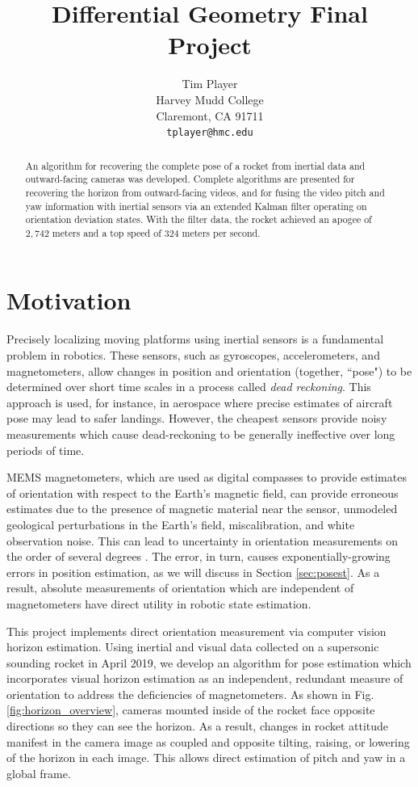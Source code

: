 \documentclass{article}
\title{Differential Geometry Final Project}
\author{%
 Tim Player \\
  Harvey Mudd College\\
  Claremont, CA 91711 \\
  \texttt{tplayer@hmc.edu} \\
}
\begin{document}
\maketitle

\begin{abstract}
    An algorithm for recovering the complete pose of a rocket from inertial data and outward-facing cameras was developed. Complete algorithms are presented for recovering the horizon from outward-facing videos, and for fusing the video pitch and yaw information with inertial sensors via an extended Kalman filter operating on orientation deviation states. With the filter data, the rocket achieved an apogee of $2,742$ meters and a top speed of  $324$ meters per second.
\end{abstract}

\section{Motivation}
Precisely localizing moving platforms using inertial sensors is a fundamental problem in robotics. These sensors, such as gyroscopes, accelerometers, and magnetometers, allow changes in position and orientation (together, ``pose") to be determined over short time scales in a process called \textit{dead reckoning}. This approach is used, for instance, in aerospace where precise estimates of aircraft pose may lead to safer landings. However, the cheapest sensors provide noisy measurements which cause dead-reckoning to be generally ineffective over long periods of time. 

MEMS magnetometers, which are used as digital compasses to provide estimates of orientation with respect to the Earth's magnetic field, can provide erroneous estimates due to the presence of magnetic material near the sensor, unmodeled geological perturbations in the Earth's field, miscalibration, and white observation noise. This can lead to uncertainty in orientation measurements on the order of several degrees \cite{usinginertialsensors}. The error, in turn, causes exponentially-growing errors in position estimation, as we will discuss in Section \ref{sec:posest}. As a result, absolute measurements of orientation which are independent of magnetometers have direct utility in robotic state estimation.

This project implements direct orientation measurement via computer vision horizon estimation. Using inertial and visual data collected on a supersonic sounding rocket in April 2019, we develop an algorithm for pose estimation which incorporates visual horizon estimation as an independent, redundant measure of orientation to address the deficiencies of magnetometers. As shown in Fig. \ref{fig:horizon_overview}, cameras mounted inside of the rocket face opposite directions so they can see the horizon. As a result, changes in rocket attitude manifest in the camera image as coupled and opposite tilting, raising, or lowering of the horizon in each image. This allows direct estimation of pitch and yaw in a global frame.
\end{document}
